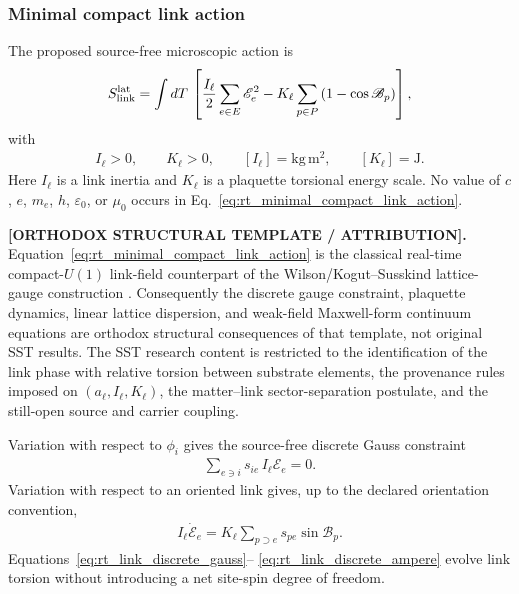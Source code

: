 \subsubsection{Minimal compact link action}

The proposed source-free microscopic action is
\begin{align}
    S_{\rm link}^{\rm lat}
    =
    \int dT\,
    \left[
        \frac{I_\ell}{2}
        \sum_{e\in E}\mathscr E_e^2
        -
        K_\ell
        \sum_{p\in P}
        \left(1-\cos\mathscr B_p\right)
    \right],
    \label{eq:rt_minimal_compact_link_action}
\end{align}
with
\begin{align}
    I_\ell>0,
    \qquad
    K_\ell>0,
    \qquad
    [I_\ell]=\mathrm{kg\,m^2},
    \qquad
    [K_\ell]=\mathrm{J}.
    \label{eq:rt_link_parameter_dimensions}
\end{align}
Here $I_\ell$ is a link inertia and $K_\ell$ is a plaquette torsional energy
scale.  No value of $c$, $e$, $m_e$, $h$, $\varepsilon_0$, or $\mu_0$ occurs in
Eq.~\eqref{eq:rt_minimal_compact_link_action}.

\textbf{[ORTHODOX STRUCTURAL TEMPLATE / ATTRIBUTION].}
Equation~\eqref{eq:rt_minimal_compact_link_action} is the classical real-time
compact-\(U(1)\) link-field counterpart of the Wilson/Kogut--Susskind lattice-
gauge construction \cite{Wilson1974,KogutSusskind1975,Kogut1979}.  Consequently
the discrete gauge constraint, plaquette dynamics, linear lattice dispersion,
and weak-field Maxwell-form continuum equations are orthodox structural
consequences of that template, not original SST results.  The SST research
content is restricted to the identification of the link phase with relative
torsion between substrate elements, the provenance rules imposed on
\((a_\ell,I_\ell,K_\ell)\), the matter--link sector-separation postulate, and the
still-open source and carrier coupling.

Variation with respect to $\phi_i$ gives the source-free discrete Gauss
constraint
\begin{align}
    \sum_{e\ni i}s_{ie}\,I_\ell\mathscr E_e=0.
    \label{eq:rt_link_discrete_gauss}
\end{align}
Variation with respect to an oriented link gives, up to the declared orientation
convention,
\begin{align}
    I_\ell\dot{\mathscr E}_e
    =
    K_\ell
    \sum_{p\supset e}s_{pe}\sin\mathscr B_p.
    \label{eq:rt_link_discrete_ampere}
\end{align}
Equations~\eqref{eq:rt_link_discrete_gauss}--
\eqref{eq:rt_link_discrete_ampere} evolve link torsion without introducing a
net site-spin degree of freedom.

